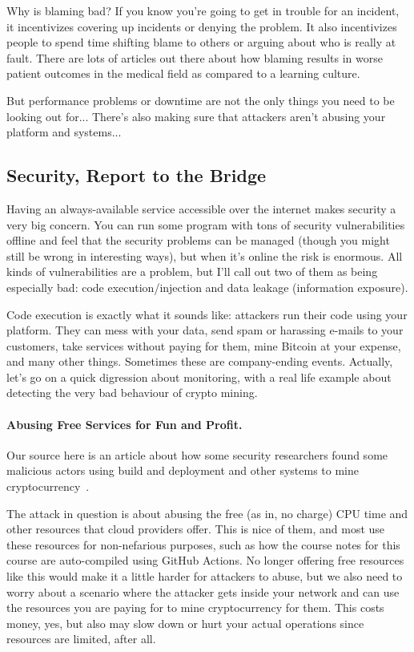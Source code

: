 Why is blaming bad? If you know you're going to get in trouble for an incident, it incentivizes covering up incidents or denying the problem. It also incentivizes people to spend time shifting blame to others or arguing about who is really at fault. There are lots of articles out there about how blaming results in worse patient outcomes in the medical field as compared to a learning culture.

But performance problems or downtime are not the only things you need to be looking out for... There's also making sure that attackers aren't abusing your platform and systems...

\subsection*{Security, Report to the Bridge}
Having an always-available service accessible over the internet makes security a very big concern. You can run some program with tons of security vulnerabilities offline and feel that the security problems can be managed (though you might still be wrong in interesting ways), but when it's online the risk is enormous. All kinds of vulnerabilities are a problem, but I'll call out two of them as being especially bad: code execution/injection and data leakage (information exposure). 

Code execution is exactly what it sounds like: attackers run their code using your platform. They can mess with your data, send spam or harassing e-mails to your customers, take services without paying for them, mine Bitcoin at your expense, and many other things. Sometimes these are company-ending events. Actually, let's go on a quick digression about monitoring, with a real life example about detecting the very bad behaviour of crypto mining.

\paragraph{Abusing Free Services for Fun and Profit.}
Our source here is an article about how some security researchers found some malicious actors using build and deployment and other systems to mine cryptocurrency~\cite{sysdig}.

The attack in question is about abusing the free (as in, no charge) CPU time and other resources that cloud providers offer. This is nice of them, and most use these resources for non-nefarious purposes, such as how the course notes for this course are auto-compiled using GitHub Actions. No longer offering free resources like this would make it a little harder for attackers to abuse, but we also need to worry about a scenario where the attacker gets inside your network and can use the resources you are paying for to mine cryptocurrency for them. This costs money, yes, but also may slow down or hurt your actual operations since resources are limited, after all.

